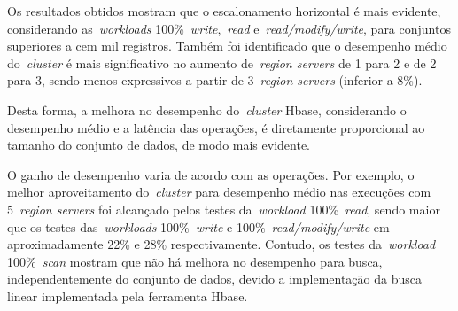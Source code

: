 \documentclass[12pt]{article}
\begin{document}
Os resultados obtidos mostram que o escalonamento horizontal é mais evidente, considerando as~\emph{workloads} 100\%~\emph{write},~\emph{read} e~\emph{read/modify/write}, para conjuntos superiores a cem mil registros. Também foi identificado que o desempenho médio do~\emph{cluster} é mais significativo no aumento de~\emph{region servers} de 1 para 2 e de 2 para 3, sendo menos expressivos a partir de 3~\emph{region servers} (inferior a 8\%). 

Desta forma, a melhora no desempenho do~\emph{cluster} Hbase, considerando o desempenho médio e a latência das operações, é diretamente proporcional ao tamanho do conjunto de dados, de modo mais evidente.

O ganho de desempenho varia de acordo com as operações. Por exemplo, o melhor aproveitamento do~\emph{cluster} para desempenho médio nas execuções com 5~\emph{region servers} foi alcançado pelos testes da~\emph{workload} 100\%~\emph{read}, sendo maior que os testes das~\emph{workloads} 100\%~\emph{write} e 100\%~\emph{read/modify/write} em aproximadamente 22\% e 28\% respectivamente. 
Contudo, os testes da~\emph{workload} 100\%~\emph{scan} mostram que não há melhora no desempenho para busca, independentemente do conjunto de dados, devido a implementação da busca linear implementada pela ferramenta Hbase.




\end{document}
